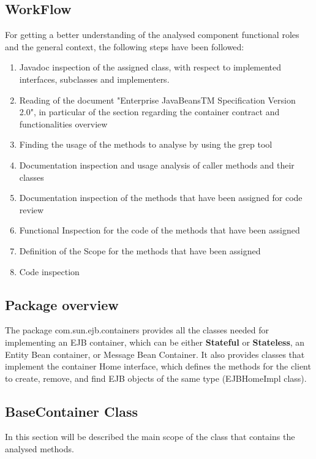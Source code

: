 \documentclass[11pt, a4paper,titlepage]{article}
\begin{document}
	\subsection{WorkFlow}
	For getting a better understanding of the analysed component functional roles and the general context, the following steps have been followed:
	\begin{enumerate}
		\item Javadoc inspection of the assigned class, with respect to implemented interfaces, subclasses and implementers.
		\item Reading of the document "Enterprise JavaBeansTM Specification Version 2.0", in particular of the section regarding the container contract and functionalities overview 
		\item Finding the usage of the methods to analyse by using the grep tool
		\item Documentation inspection and usage analysis of caller methods and their classes
		\item Documentation inspection of the methods that have been assigned for code review
		\item Functional Inspection for the code of the methods that have been assigned
		\item Definition of the Scope for the methods that have been assigned
		\item Code inspection
	\end{enumerate}
	
	\subsection{Package overview}
	The package com.sun.ejb.containers provides all the classes needed for implementing an EJB container, which can be either \textbf{Stateful} or \textbf{Stateless}, an Entity Bean container, or Message Bean Container. \newline
	It also provides classes that implement the container Home interface, which defines the methods for the client to create, remove, and find EJB objects of the same type (EJBHomeImpl class).
	
	\subsection{BaseContainer Class}
	In this section will be described the main scope of the class that contains the analysed methods. 
	 
\end{document}
